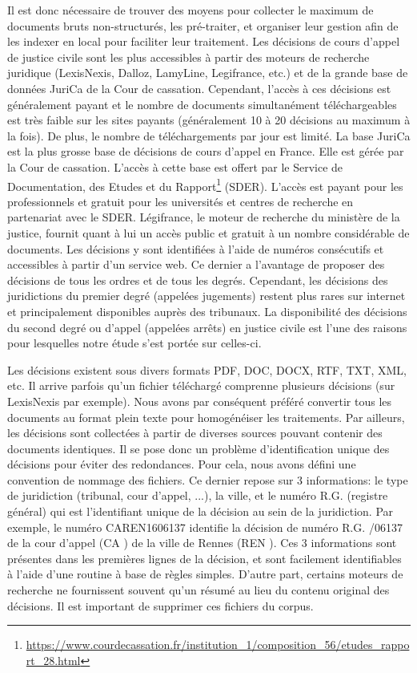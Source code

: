  Il est donc nécessaire de trouver des moyens pour collecter le maximum de documents bruts non-structurés, les pré-traiter, et organiser leur gestion afin de les indexer en local pour faciliter leur traitement. Les décisions de cours d'appel de justice civile sont les plus accessibles à partir des moteurs de recherche juridique (LexisNexis, Dalloz, LamyLine, Legifrance, etc.) et de la grande base de données JuriCa de la Cour de cassation. Cependant, l'accès à ces décisions est généralement payant et le nombre de documents simultanément téléchargeables est très faible sur les sites payants (généralement 10 à 20 décisions au maximum à la fois). De plus, le nombre de téléchargements par jour est limité. La base JuriCa est la plus grosse base de décisions de cours d'appel en France. Elle est gérée par la Cour de cassation. L'accès à cette base est offert par le Service de Documentation, des Etudes et du Rapport\footnote{\url{https://www.courdecassation.fr/institution_1/composition_56/etudes_rapport_28.html}} (SDER). L'accès est payant pour les professionnels et gratuit pour les universités et centres de recherche en partenariat avec le SDER. Légifrance, le moteur de recherche du ministère de la justice, fournit quant à lui un accès public et gratuit à un nombre considérable de documents. Les décisions y sont identifiées à l'aide de numéros consécutifs et accessibles à partir d'un service web. Ce dernier a l'avantage de proposer des décisions de tous les ordres et de tous les degrés. Cependant, les décisions des juridictions du premier degré (appelées jugements) restent plus rares sur internet et principalement disponibles auprès des tribunaux.  La disponibilité des décisions du second degré ou d'appel (appelées arrêts) en justice civile est l'une des raisons pour lesquelles notre étude s'est portée sur celles-ci.

Les décisions existent sous divers formats PDF, DOC, DOCX, RTF, TXT, XML, etc. Il arrive parfois qu'un fichier téléchargé comprenne plusieurs décisions (sur LexisNexis par exemple). Nous avons par conséquent préféré convertir tous les documents au format plein texte pour homogénéiser les traitements. Par ailleurs, les décisions sont collectées à partir de diverses sources pouvant contenir des documents identiques. Il se pose donc un problème d'identification unique des décisions pour éviter des redondances. Pour cela, nous avons défini une convention de nommage des fichiers. Ce dernier repose sur 3 informations: le type de juridiction (tribunal, cour d'appel, ...), la ville, et le numéro R.G. (registre général) qui est l'identifiant unique de la décision au sein de la juridiction. Par exemple, le numéro \og CAREN1606137 \fg{} identifie la décision de numéro R.G. /06137 \fg{} de la cour d'appel (\og CA \fg{}) de la ville de Rennes (\og REN \fg{}). Ces 3 informations sont présentes dans les premières lignes de la décision, et sont facilement identifiables à l'aide d'une routine à base de règles simples. D'autre part, certains moteurs de recherche ne fournissent souvent qu'un résumé au lieu du contenu original des décisions. Il est important de supprimer ces fichiers du corpus.

